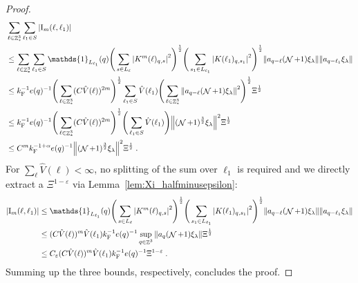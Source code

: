 \documentclass[12pt,a4paper]{article}
\numberwithin{equation}{section}
\newcommand{\1}{\mathbb{I}}
\newcommand{\F}{\mathrm{F}}
\newcommand{\I}{\mathrm{I}}
\DeclareMathOperator{\Z}{\mathbb{Z}}
\DeclareMathOperator{\NN}{\mathcal{N}}
\newcommand{\half}{\frac{1}{2}}
\theoremstyle{plain}
\theoremstyle{definition}
\theoremstyle{remark}
\theoremstyle{plain}
\theoremstyle{definition}
\theoremstyle{remark}
\begin{document}
\begin{proof}
{\begin{align}
	&\sum_{\ell \in \Z^3_*} \sum_{\ell_1 \in S} |\I_m(\ell, \ell_1)| \nonumber\\
	&\leq \sum_{\ell \in \Z^3_*} \sum_{\ell_1 \in S} \mathds{1}_{L_{\ell_1}}(q) \Bigg(\sum\limits_{s \in L_{\ell}} \abs{K^m(\ell)_{q,s}}^2\Bigg)^\half
		\Bigg(\sum\limits_{s_1 \in L_{\ell_1}} \abs{K(\ell_1)_{q,s_1}}^2\Bigg)^\half
		\norm{ a_{q-\ell} (\NN+1) \xi_\lambda}
		\norm{ a_{q-\ell_1} \xi_\lambda }\nonumber\\
	&\leq k_{\F}^{-1} e(q)^{-1}
		\Bigg( \sum_{\ell \in \Z^3_*} (C \hat{V}(\ell))^{2m} \Bigg)^{\half}
		\sum_{\ell_1 \in S} \hat{V}(\ell_1)
		\Bigg( \sum_{\ell \in \Z^3_*} \norm{ a_{q-\ell} (\NN+1) \xi_\lambda}^2 \Bigg)^{\half}
		\Xi^{\half} \nonumber\\
	&\leq k_{\F}^{-1} e(q)^{-1}
		\Bigg( \sum_{\ell \in \Z^3_*} (C \hat{V}(\ell))^{2m} \Bigg)^{\half}
		\Bigg( \sum_{\ell_1 \in S} \hat{V}(\ell_1) \Bigg) \norm{(\NN+1)^{\frac 32} \xi_\lambda}^2 \Xi^{\half} \nonumber\\
	&\leq C^m k_{\F}^{-1 + \alpha} e(q)^{-1}
		\norm{(\NN+1)^{\frac 32} \xi_\lambda}^2 \Xi^{\half} \;. \label{eq:estEQ2113_Coulomb_2}
\end{align}
}
For $ \sum_\ell \hat{V}(\ell) < \infty $, no splitting of the sum over $ \ell_1 $ is required and we directly extract a $ \Xi^{1-\varepsilon} $ via Lemma~\ref{lem:Xi_halfminusepsilon}:
\begin{align}
	|\I_m(\ell, \ell_1)|
	&\leq \mathds{1}_{L_{\ell_1}}(q) \Bigg(\sum\limits_{s \in L_{\ell}} \abs{K^m(\ell)_{q,s}}^2\Bigg)^\half
		\Bigg(\sum\limits_{s_1 \in L_{\ell_1}} \abs{K(\ell_1)_{q,s_1}}^2\Bigg)^\half
		\norm{ a_{q-\ell} (\NN+1) \xi_\lambda}
		\norm{ a_{q-\ell_1} \xi_\lambda }\nonumber\\
	&\leq (C \hat{V}(\ell))^m \hat{V}(\ell_1) k_{\F}^{-1} e(q)^{-1}
		\sup_{q \in \Z^3} \norm{ a_q (\NN+1) \xi_\lambda }\Xi^{\half} \nonumber\\
	&\leq C_\varepsilon (C \hat{V}(\ell))^m
		\hat{V}(\ell_1)
		k_{\F}^{-1} e(q)^{-1} \Xi^{1-\varepsilon} \;. \label{eq:estEQ2113}
\end{align}
Summing up the three bounds, respectively, concludes the proof.
\end{proof}
\end{document}
